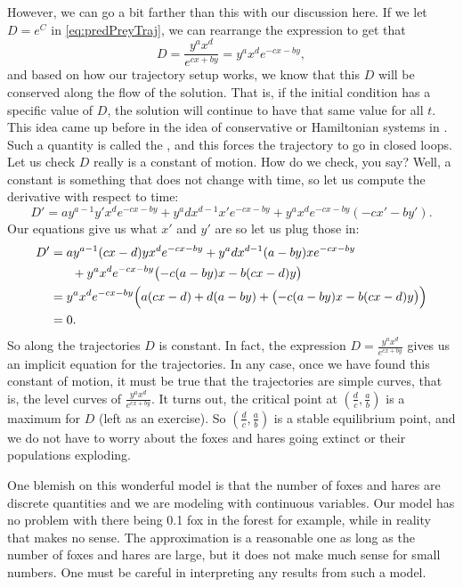 \documentclass{ximera}
\begin{document}
However, we can go a bit farther than this with our discussion here. If we let $D = e^C$ in \eqref{eq:predPreyTraj}, we can rearrange the expression to get that 
\begin{equation*}
    D = \frac{y^a x^d}{e^{cx+by}} = y^a x^d e^{-cx-by},
\end{equation*}
and based on how our trajectory setup works, we know that this $D$ will be conserved along the flow of the solution. That is, if the initial condition has a specific value of $D$, the solution will continue to have that same value for all $t$. This idea came up before in the idea of conservative or Hamiltonian systems in . Such a quantity is called the \emph{}, and this forces the trajectory to go in closed loops.  Let us check $D$ really is a constant of motion.  How do we check, you say?  Well, a constant is something that does not change with time, so let us compute the derivative with respect to time:
\begin{equation*}
    D' =  a y^{a-1}y' x^d e^{-cx-by} + y^a d x^{d-1} x' e^{-cx-by} + y^a x^d e^{-cx-by} (-cx'-by') .
\end{equation*}
Our equations give us what $x'$ and $y'$ are so let us plug those in:
\begin{equation*}
    \begin{split}
        D' & = a y^{a-1} (cx-d)y x^d e^{-cx-by} + y^a d x^{d-1} (a-by)x e^{-cx-by} \\
        & \phantom{mm} + y^a x^d e^{-cx-by} \bigl(-c(a-by)x-b(cx-d)y\bigr) \\
        & = y^a x^d e^{-cx-by}
        \Bigl(
            a (cx-d) + d (a-by) + \bigl(-c(a-by)x-b(cx-d)y\bigr) 
        \Bigr) \\
        & = 0 .
    \end{split}
\end{equation*}
So along the trajectories $D$ is constant.  In fact, the expression $D = \frac{y^a x^d}{e^{cx+by}}$ gives us an implicit equation for the trajectories.  In any case, once we have found this constant of motion, it must be true that the trajectories are simple curves, that is, the level curves of $\frac{y^a x^d}{e^{cx+by}}$.  It turns out, the critical point at $(\frac{d}{c},\frac{a}{b})$ is a maximum for $D$ (left as an exercise). So $(\frac{d}{c},\frac{a}{b})$ is a stable equilibrium point, and we do not have to worry about the foxes and hares going extinct or their populations exploding.

One blemish on this wonderful model is that the number of foxes and hares are discrete quantities and we are modeling with continuous variables.  Our model has no problem with there being 0.1 fox in the forest for example, while in reality that makes no sense.  The approximation is a reasonable one as long as the number of foxes and hares are large, but it does not make much sense for small numbers.  One must be careful in interpreting any results from such a model.
\end{document}
